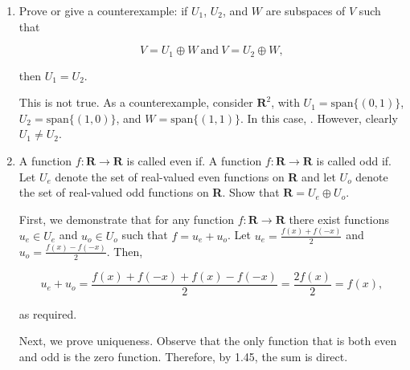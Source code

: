 \documentclass{book}
\begin{document}
\begin{enumerate}
\item Prove or give a counterexample: if \(U_1\), \(U_2\), and \(W\) are subspaces of \(V\) such that

\begin{equation*}
    V=U_1 \oplus W \ \textrm{and} \ V=U_2 \oplus W,
\end{equation*}

then \(U_1=U_2\).

This is not true.  As a counterexample, consider \(\textbf{R}^2\), with \(U_1=\textrm{span}\{(0,1)\}\), \(U_2=\textrm{span}\{(1,0)\}\), and \(W=\textrm{span}\{(1,1)\}\).  In this case, .  However, clearly \(U_1 \neq U_2\).

\item A function \(f: \textbf{R} \rightarrow \textbf{R}\) is called even if.  A function \(f: \textbf{R} \rightarrow \textbf{R}\) is called odd if.  Let \(U_e\) denote the set of real-valued even functions on \textbf{R} and let \(U_o\) denote the set of real-valued odd functions on \textbf{R}.  Show that \(\textbf{R} = U_e \oplus U_o\).

First, we demonstrate that for any function \(f: \textbf{R} \rightarrow \textbf{R}\) there exist functions \(u_e \in U_e\) and \(u_o \in U_o\) such that \(f = u_e + u_o\).  Let \(u_e = \frac{f(x)+f(-x)}{2}\) and \(u_o = \frac{f(x)-f(-x)}{2}\).  Then, 

\begin{equation*}
    u_e+u_o=\frac{f(x)+f(-x)+f(x)-f(-x)}{2}=\frac{2f(x)}{2}=f(x), 
\end{equation*}

as required.

Next, we prove uniqueness.  Observe that the only function that is both even and odd is the zero function.  Therefore, by 1.45, the sum is direct.

\end{enumerate}
\end{document}
